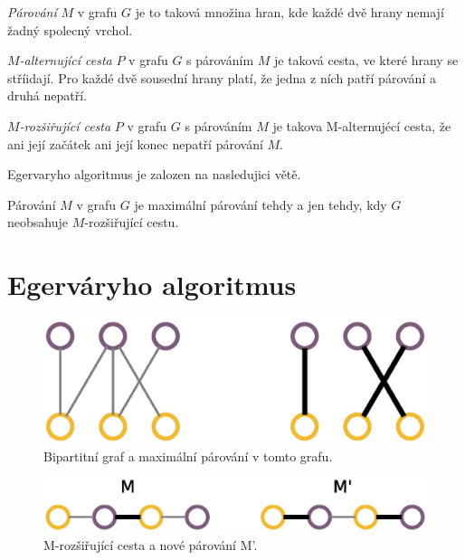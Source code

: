 \documentclass[a4paper, 11pt, titlepage, final]{article}[3. prosinec 2011]
\begin{document}
\begin{Definice}
\textit{Párování} $M$ v grafu $G$ je to taková množina hran, kde každé dvě hrany nemají žadný spolecný vrchol.
\end{Definice}

\begin{Definice}
\textit{$M$-alternující cesta} $P$ v grafu $G$ s párováním $M$ je taková cesta, ve které hrany se stříidají. Pro každé dvě sousední hrany platí, že jedna z ních patří párování a druhá nepatří.
\end{Definice}

\begin{Definice}
\textit{$M$-rozšiřující cesta} $P$ v grafu $G$ s párováním $M$ je takova M-alternujécí cesta, že ani její začátek ani její konec nepatří párování $M$.
\end{Definice}

Egervaryho algoritmus je zalozen na nasledujici větě.

\begin{Definice}[Berge]
Párování $M$ v grafu $G$ je maximální párování tehdy a jen tehdy, kdy $G$ neobsahuje $M$-rozšiřující cestu. 
\end{Definice}

\section{Egerváryho algoritmus} \label{secEgervary}


\begin{figure}[ht]
  \centering
  \includegraphics[scale=0.5]{img/bipartite.eps}
  \caption{Bipartitní graf a maximální párování v tomto grafu.}
  \label{imgBipartite}
\end{figure}

\begin{figure}[ht]
  \centering
  \includegraphics[scale=0.5]{img/mpath.eps}
  \caption{M-rozšiřující cesta a nové párování M'.}
  \label{imgPath}
\end{figure}
\end{document}
